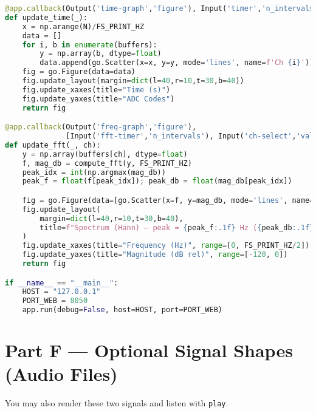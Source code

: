 \documentclass[11pt]{article}
\begin{document}
\begin{lstlisting}[language=Python, caption={Dash serial plotter (time + spectrum)}]
@app.callback(Output('time-graph','figure'), Input('timer','n_intervals'))
def update_time(_):
    x = np.arange(N)/FS_PRINT_HZ
    data = []
    for i, b in enumerate(buffers):
        y = np.array(b, dtype=float)
        data.append(go.Scatter(x=x, y=y, mode='lines', name=f'Ch {i}'))
    fig = go.Figure(data=data)
    fig.update_layout(margin=dict(l=40,r=10,t=30,b=40))
    fig.update_xaxes(title="Time (s)")
    fig.update_yaxes(title="ADC Codes")
    return fig

@app.callback(Output('freq-graph','figure'),
              [Input('fft-timer','n_intervals'), Input('ch-select','value')])
def update_fft(_, ch):
    y = np.array(buffers[ch], dtype=float)
    f, mag_db = compute_fft(y, FS_PRINT_HZ)
    peak_idx = int(np.argmax(mag_db))
    peak_f = float(f[peak_idx]); peak_db = float(mag_db[peak_idx])

    fig = go.Figure(data=[go.Scatter(x=f, y=mag_db, mode='lines', name=f'Ch {ch}')])
    fig.update_layout(
        margin=dict(l=40,r=10,t=30,b=40),
        title=f"Spectrum (Hann) — peak ≈ {peak_f:.1f} Hz ({peak_db:.1f} dB rel)"
    )
    fig.update_xaxes(title="Frequency (Hz)", range=[0, FS_PRINT_HZ/2])
    fig.update_yaxes(title="Magnitude (dB rel)", range=[-120, 0])
    return fig

if __name__ == "__main__":
    HOST = "127.0.0.1"
    PORT_WEB = 8050
    app.run(debug=False, host=HOST, port=PORT_WEB)
\end{lstlisting}

\section*{Part F — Optional Signal Shapes (Audio Files)}
You may also render these two signals and listen with \texttt{play}.
\end{document}
